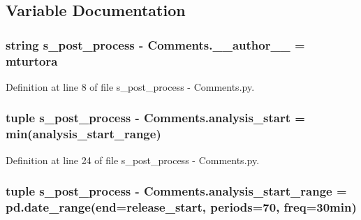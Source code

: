 \subsection{Variable Documentation}
\hypertarget{namespaces__post__process_01-_01_comments_aa93abb3c2ba5b38151b6fae9743987e1}{}
\subsubsection[{\+\_\+\+\_\+author\+\_\+\+\_\+}]{\setlength{\rightskip}{0pt plus 5cm}string s\+\_\+post\+\_\+process -\/ Comments.\+\_\+\+\_\+author\+\_\+\+\_\+ = \textquotesingle{}mturtora\textquotesingle{}}\label{namespaces__post__process_01-_01_comments_aa93abb3c2ba5b38151b6fae9743987e1}


Definition at line 8 of file s\+\_\+post\+\_\+process -\/ Comments.\+py.

\hypertarget{namespaces__post__process_01-_01_comments_a9323e6fee869aa9c51bc49305dcb973d}{}
\subsubsection[{analysis\+\_\+start}]{\setlength{\rightskip}{0pt plus 5cm}tuple s\+\_\+post\+\_\+process -\/ Comments.\+analysis\+\_\+start = min({\bf analysis\+\_\+start\+\_\+range})}\label{namespaces__post__process_01-_01_comments_a9323e6fee869aa9c51bc49305dcb973d}


Definition at line 24 of file s\+\_\+post\+\_\+process -\/ Comments.\+py.

\hypertarget{namespaces__post__process_01-_01_comments_a52f70ed51d091a8626e86e98b3375f39}{}
\subsubsection[{analysis\+\_\+start\+\_\+range}]{\setlength{\rightskip}{0pt plus 5cm}tuple s\+\_\+post\+\_\+process -\/ Comments.\+analysis\+\_\+start\+\_\+range = pd.\+date\+\_\+range(end={\bf release\+\_\+start}, periods=70, freq=\textquotesingle{}30min\textquotesingle{})}\label{namespaces__post__process_01-_01_comments_a52f70ed51d091a8626e86e98b3375f39}


